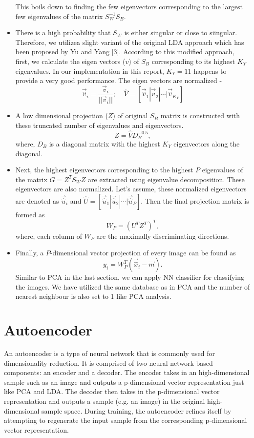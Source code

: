 \documentclass{article}
\begin{document}
\begin{itemize}
This boils down to finding the few eigenvectors corresponding to the largest few eigenvalues of the matrix  $S_W^{-1}S_B$.
\item There is a high probability that $S_W$ is either singular or close to siingular. Therefore, we utilizea slight variant of the original LDA approach which has been proposed by Yu and Yang [3]. According to this modified approach, first, we calculate the eigen vectors ($v$) of $S_B$ corresponding to its highest $K_Y$ eigenvalues. In our implementation in this report, $K_Y=11$ happens to provide a very good performance. The eigen vectors are normalized -
\begin{equation}
	\vec{\hat{v}}_i = \frac{\vec{v}_i}{||\vec{v}_i||};\;\;\;\;\hat{V} = [\vec{\hat{v}}_1 | \vec{\hat{v}}_2 | \cdots | \vec{\hat{v}}_{K_Y}]
\end{equation}
\item A low dimensional projection ($Z$) of original $S_B$ matrix is constructed with these truncated number of eigenvalues and eigenvectors.
\begin{equation}
	Z = \hat{V}D_B^{-0.5},
\end{equation}
where, $D_B$ is a diagonal matrix with the highest $K_Y$ eigenvectors along the diagonal.
\item Next, the highest eigenvectors corresponding to the highest $P$ eigenvalues of the matrix $G=Z^TS_WZ$ are extracted using eigenvalue decomposition. These eigenvectors are also normalized. Let's assume, these normalized eigenvectors are denoted as $\vec{\hat{u}}_i$ and $\hat{U} = [\vec{\hat{u}}_1 | \vec{\hat{u}}_2 | \cdots | \vec{\hat{u}}_P]$. Then the final projection matrix is formed as 
\begin{equation}
	W_P = (U^TZ^T)^T,
\end{equation}
where, each column of $W_P$ are the maximally discriminating directions.
\item Finally, a $P$-dimensional vector projection of every image can be found as
\begin{equation}
	y_i = W_P^T(\vec{\hat{x}}_i - \vec{m}).
\end{equation}
Similar to PCA in the last section, we can apply NN classifier for classifying the images. We have utilized the same database as in PCA and the number of nearest neighbour is also set to 1 like PCA analysis.
\end{itemize}
\section{Autoencoder}
An autoencoder is a type of neural network that is commonly used for dimensionality reduction. It is comprised of two neural network based components: an encoder and a decoder. The encoder takes in an high-dimensional sample such as an image and outputs a p-dimensional vector representation just like PCA and LDA. The decoder then takes in the p-dimensional vector representation and outputs a sample (e.g. an image) in the original high-dimensional sample space. During training, the autoencoder refines itself by attempting to regenerate the input sample from the corresponding p-dimensional vector representation.
\end{document}
